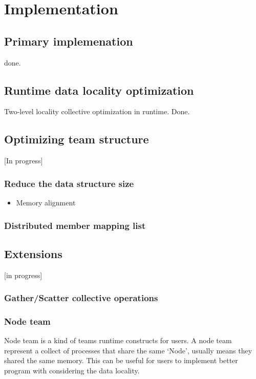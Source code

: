 \chapter{Implementation}\label{chap:Algorithms}
\section{Primary implemenation} 
done.
\section{Runtime data locality optimization}
Two-level locality collective optimization in runtime. Done. 

\section{Optimizing team structure}
[In progress]
\subsection{Reduce the data structure size}
\begin{itemize}
\item Memory alignment
\end{itemize}
\subsection{Distributed member mapping list}

\section{Extensions}
[in progress]
\subsection{Gather/Scatter collective operations}
\subsection{Node team}
Node team is a kind of teams runtime constructs for users. A node team represent a collect of processes that share the same `Node', usually means they shared the same memory. This can be useful for users to implement better program with considering the data locality. 
